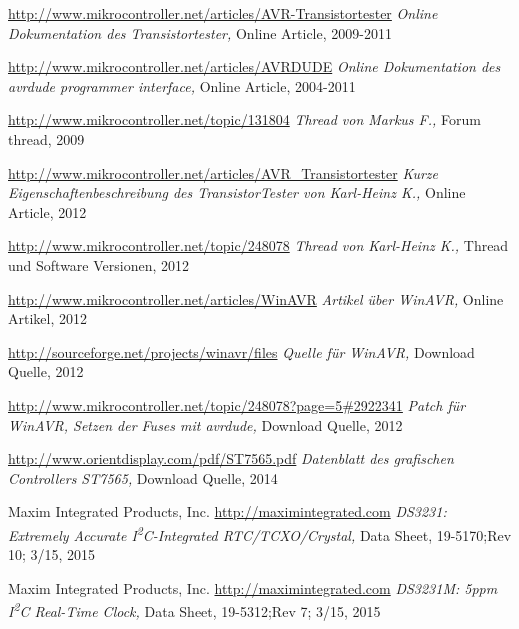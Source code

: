\documentclass[pdftex,12pt,a4paper,oneside,english]{report}
\begin{document}
\begin{thebibliography}{99}
\url{http://www.mikrocontroller.net/articles/AVR-Transistortester}
\emph{Online Dokumentation des Transistortester,}
Online Article,
2009-2011

\url{http://www.mikrocontroller.net/articles/AVRDUDE}
\emph{Online Dokumentation des avrdude programmer interface,}
Online Article,
2004-2011

\url{http://www.mikrocontroller.net/topic/131804}
\emph{Thread von Markus F.,}
Forum thread, 
2009

\url{http://www.mikrocontroller.net/articles/AVR\_Transistortester}
\emph{Kurze Eigenschaftenbeschreibung des TransistorTester von Karl-Heinz K.,}
Online Article,
2012

\url{http://www.mikrocontroller.net/topic/248078}
\emph{Thread von Karl-Heinz K.,}
Thread und Software Versionen,
2012

\url{http://www.mikrocontroller.net/articles/WinAVR}
\emph{Artikel über WinAVR,}
Online Artikel,
2012

\url{http://sourceforge.net/projects/winavr/files}
\emph{Quelle für WinAVR,}
Download Quelle,
2012

\url{http://www.mikrocontroller.net/topic/248078?page=5#2922341}
\emph{Patch für WinAVR, Setzen der Fuses mit avrdude,}
Download Quelle,
2012

\url{http://www.orientdisplay.com/pdf/ST7565.pdf}
\emph{Datenblatt des grafischen Controllers ST7565,}
Download Quelle,
2014

Maxim Integrated Products, Inc.
\url{http://maximintegrated.com}
\emph{DS3231: Extremely Accurate I\textsuperscript{2}C-Integrated RTC/TCXO/Crystal,}
Data Sheet,
19-5170;Rev 10; 3/15,
2015

Maxim Integrated Products, Inc.
\url{http://maximintegrated.com}
\emph{DS3231M: 5ppm I\textsuperscript{2}C Real-Time Clock,}
Data Sheet,
19-5312;Rev 7; 3/15,
2015


\end{thebibliography}
\end{document}
